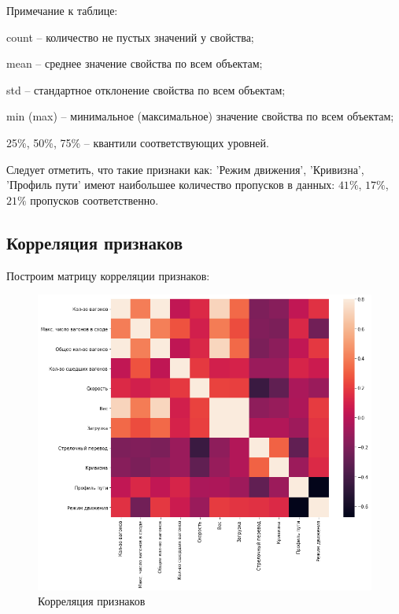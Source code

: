 Примечание к таблице: 

\begin{description}[font=$\bullet$]
    \item count -- количество не пустых значений у свойства;
    \item mean -- среднее значение свойства по всем объектам;
    \item std -- стандартное отклонение свойства по всем объектам;
    \item min (max) -- минимальное (максимальное) значение свойства по всем объектам;
    \item 25\%, 50\%, 75\% -- квантили соответствующих уровней. 
\end{description}

Следует отметить, что такие признаки как: 'Режим движения', 'Кривизна', 'Профиль пути' имеют наибольшее количество пропусков в данных: $41\%$, $17\%$, $21\%$ пропусков соответственно.



\subsection{Корреляция признаков}

Построим матрицу корреляции признаков:

\begin{figure}[H]
    \begin{center}
        \includegraphics[width=0.85\linewidth]{src/img/df_corr.png}
        \caption{Корреляция признаков}
        \label{fig:df_corr}
    \end{center}
\end{figure}

